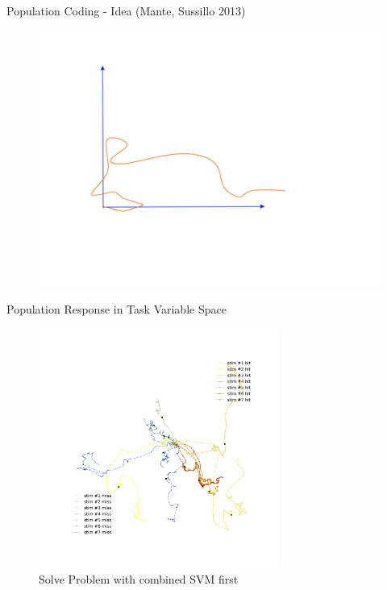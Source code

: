 \documentclass[10pt]{beamer}
\begin{document}
\begin{frame}[fragile]{Population Coding - Idea (Mante, Sussillo 2013)}
\begin{center}
	\begin{figure}
      \includegraphics[width=1.0\textwidth]{trafo_final.png}
	\end{figure}
	\end{center}
\end{frame}

\begin{frame}[fragile]{Population Response in Task Variable Space}
\begin{center}
	\begin{figure}
	\caption*{Solve Problem with combined SVM first}
      \includegraphics[width=0.7\textwidth]{reg.png}
	\end{figure}
	\end{center}
\end{frame}
\end{document}
